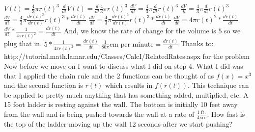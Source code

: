 \documentclass{article}
\begin{document}
\newline
\newline
$V(t) = \frac{4}{3}\pi r(t)^3$
\newline
\newline
$\frac{d}{dt}V(t) = \frac{d}{dt}\frac{4}{3}\pi r(t)^3$
\newline
\newline
$\frac{dV}{dt} = \frac{4}{3}\pi\frac{d}{dt} r(t)^3$
\newline
\newline
$\frac{dV}{dt} = \frac{4}{3}\pi\frac{d}{dt} r(t)^3$
\newline
\newline
$\frac{dV}{dt} = \frac{4}{3}\pi\frac{dr(t)^3}{dr(t)} r(t)^3 * \frac{dr(t)}{dt}$
\newline
\newline
$\frac{dV}{dt} = \frac{4}{3}\pi\frac{dr(t)^3}{dr(t)} r(t)^3 * \frac{dr(t)}{dt}$
\newline
\newline
$\frac{dV}{dt} = 4\pi r(t)^2 * \frac{dr(t)}{dt}$
\newline
\newline
$\frac{dV}{dt} * \frac{1}{4\pi r(t)^2}  =  \frac{dr(t)}{dt}$
\newline
\newline
And, we know the rate of change for the volume is $5$ so we plug that in.
\newline
\newline
$5 * \frac{1}{4\pi r(t)^2}  =  \frac{dr(t)}{dt}$
\newline
\newline
$\frac{1}{80\pi} \text{cm per minute} =  \frac{dr(t)}{dt}$
\newline
\newline
Thanks to: http://tutorial.math.lamar.edu/Classes/CalcI/RelatedRates.aspx for the problem
\newline
\newline
Now before we move on I want to discuss what I did on step 4. What I did was that I applied the chain rule and the 2 functions can be thought of as $f(x) = x^3$ and the second function is $r(t)$ which results in $f(r(t))$. This technique can be applied to pretty much anything that has something added, multiplied, etc.
\newline
\newline
A 15 foot ladder is resting against the wall. The bottom is initially 10 feet away from the wall and is being pushed towards the wall at a rate of $\frac{1}{4}\frac{\text{ft.}}{\text{sec}}$. How fast is the top of the ladder moving up the wall 12 seconds after we start pushing?
\end{document}
